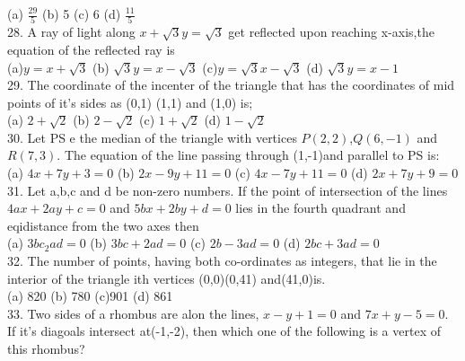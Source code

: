 \documentclass[12pt]{article}
\begin{document}
(a) $\frac{29}{5}$ \hspace{1cm} (b) 5 \hspace{1cm} (c) 6 \hspace{1cm} (d) $\frac{11}{5}$\\
28. A ray of light along $x+\sqrt{3}y=\sqrt{3}$ get reflected upon reaching x-axis,the equation of the reflected ray is\\
(a)$y=x+\sqrt{3}$ \hspace{1cm} (b) $\sqrt{3}y=x-\sqrt{3}$ \hspace{1cm} (c)$y=\sqrt{3}x-\sqrt{3}$ \hspace{1cm} (d) $\sqrt{3}y=x-1$ \\
29. The coordinate of the incenter of the triangle that has the coordinates of mid points of it's sides as (0,1) (1,1) and (1,0) is;\\
(a) $2+\sqrt{2}$\hspace{1cm} (b) $2-\sqrt{2}$ \hspace{1cm} (c) $1
+\sqrt{2}$ \hspace{1cm} (d) $1-\sqrt{2}$\\
30. Let PS e the median of the triangle with vertices $P(2,2)$,$Q(6,-1)$ and $R(7,3)$. The equation of the line passing through (1,-1)and parallel to PS is:\\
(a) $4x+7y+3=0$ \hspace{1cm} (b) $2x-9y+11=0$ \hspace{1cm} (c)
$4x-7y+11=0$ \hspace{1cm} (d) $2x+7y+9=0$ \\
31. Let a,b,c and d be non-zero numbers. If the point of intersection of the lines $4ax+2ay+c=0$ and $5bx+2by+d=0$ lies in the fourth quadrant and eqidistance from the two axes then \\
(a) $3bc_2ad=0$  \hspace{1cm} (b) $3bc+2ad=0$\hspace{1cm} (c) $2b-3ad=0$ \hspace{1cm} (d) $2bc+3ad=0$\\
32. The number of points, having both co-ordinates as integers, that lie in the interior of the triangle ith vertices (0,0)(0,41) and(41,0)is.\\
(a) 820 \hspace{1cm} (b) 780 \hspace{1cm} (c)901 \hspace{1cm} (d) 861\\
33. Two sides  of a rhombus are alon the lines, $x-y+1=0$ and $7x+y-5=0$. If it's diagoals intersect at(-1,-2), then which one of the following is a vertex of this rhombus?\\
\end{document}
